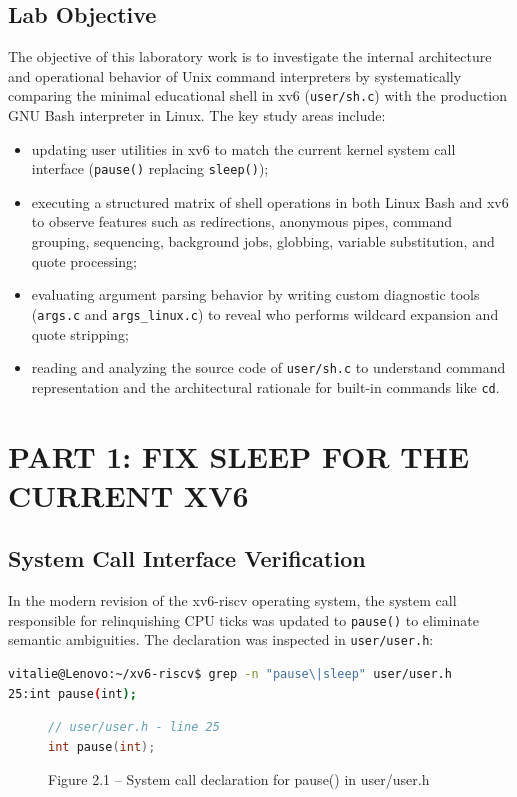 \documentclass[12pt,a4paper]{report}
\numberwithin{equation}{chapter}
\numberwithin{figure}{chapter}
\numberwithin{table}{chapter}
\begin{document}
\section{Lab Objective}
The objective of this laboratory work is to investigate the internal architecture and operational behavior of Unix command interpreters by systematically comparing the minimal educational shell in xv6 (\texttt{user/sh.c}) with the production GNU Bash interpreter in Linux. The key study areas include:
\begin{itemize}
    \item updating user utilities in xv6 to match the current kernel system call interface (\texttt{pause()} replacing \texttt{sleep()});
    \item executing a structured matrix of shell operations in both Linux Bash and xv6 to observe features such as redirections, anonymous pipes, command grouping, sequencing, background jobs, globbing, variable substitution, and quote processing;
    \item evaluating argument parsing behavior by writing custom diagnostic tools (\texttt{args.c} and \texttt{args\_linux.c}) to reveal who performs wildcard expansion and quote stripping;
    \item reading and analyzing the source code of \texttt{user/sh.c} to understand command representation and the architectural rationale for built-in commands like \texttt{cd}.
\end{itemize}

\chapter{PART 1: FIX SLEEP FOR THE CURRENT XV6}

\section{System Call Interface Verification}
In the modern revision of the xv6-riscv operating system, the system call responsible for relinquishing CPU ticks was updated to \texttt{pause()} to eliminate semantic ambiguities. The declaration was inspected in \texttt{user/user.h}:

\begin{lstlisting}[language=bash]
vitalie@Lenovo:~/xv6-riscv$ grep -n "pause\|sleep" user/user.h
25:int pause(int);
\end{lstlisting}

\begin{figure}[H]
\centering
\begin{lstlisting}[language=c]
// user/user.h - line 25
int pause(int);
\end{lstlisting}
\caption{Figure 2.1 -- System call declaration for pause() in user/user.h}
\end{figure}
\end{document}
